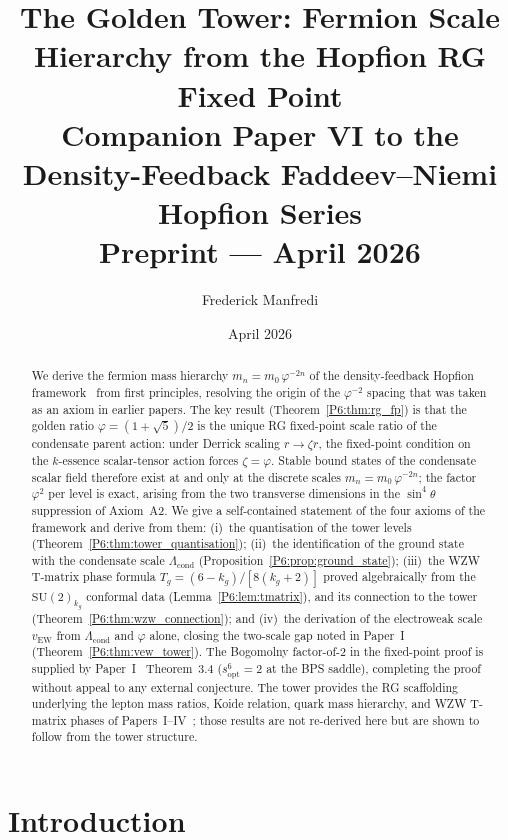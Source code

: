 \documentclass[11pt,a4paper]{article}
\title{\textbf{The Golden Tower: Fermion Scale Hierarchy from the Hopfion RG Fixed Point}
\\[0.6em]
{\large Companion Paper VI to the Density-Feedback
Faddeev--Niemi Hopfion Series}
\\[0.6em]
\large Preprint --- April 2026}
\author{Frederick Manfredi}
\date{April 2026}
\theoremstyle{definition}
\theoremstyle{remark}
\newcommand{\vp}{\varphi}
\newcommand{\sopt}{s_{\mathrm{opt}}}
\newcommand{\vEW}{v_{\mathrm{EW}}}
\newcommand{\Lcond}{\Lambda_{\mathrm{cond}}}
\begin{document}
\maketitle

\begin{abstract}
We derive the fermion mass hierarchy $m_n = m_0\,\vp^{-2n}$ of the
density-feedback Hopfion framework~\cite{Paper1,Paper2,Paper3,Paper4,Paper5}
from first principles, resolving the origin of the $\vp^{-2}$ spacing
that was taken as an axiom in earlier papers.
The key result (Theorem~\ref{P6:thm:rg_fp}) is that the golden ratio
$\vp = (1+\sqrt{5})/2$ is the unique RG fixed-point scale ratio of the
condensate parent action: under Derrick scaling $r\to\zeta r$, the
fixed-point condition on the $k$-essence scalar-tensor action forces
$\zeta = \vp$.
Stable bound states of the condensate scalar field therefore exist at
and only at the discrete scales $m_n = m_0\,\vp^{-2n}$; the factor
$\vp^2$ per level is exact, arising from the two transverse dimensions
in the $\sin^4\!\theta$ suppression of Axiom~A2.
We give a self-contained statement of the four axioms of the framework
and derive from them: (i)~the quantisation of the tower levels
(Theorem~\ref{P6:thm:tower_quantisation}); (ii)~the identification of the
ground state with the condensate scale $\Lcond$
(Proposition~\ref{P6:prop:ground_state}); (iii)~the WZW T-matrix phase
formula $T_g=(6-k_g)/[8(k_g+2)]$ proved algebraically from the
$\mathrm{SU}(2)_{k_g}$ conformal data (Lemma~\ref{P6:lem:tmatrix}), and its
connection to the tower (Theorem~\ref{P6:thm:wzw_connection}); and
(iv)~the derivation of the electroweak scale $\vEW$ from $\Lcond$ and
$\vp$ alone, closing the two-scale gap noted in Paper~I
(Theorem~\ref{P6:thm:vew_tower}).
The Bogomolny factor-of-$2$ in the fixed-point proof is supplied by
Paper~I~\cite{Paper1} Theorem~3.4 ($\sopt^6 = 2$ at the BPS saddle), completing
the proof without appeal to any external conjecture.
The tower provides the RG scaffolding underlying the lepton mass ratios,
Koide relation, quark mass hierarchy, and WZW T-matrix phases of
Papers~I--IV~\cite{Paper1,Paper2,Paper3,Paper4}; those results are not
re-derived here but are shown to follow from the tower structure.
\end{abstract}

\tableofcontents
\bigskip

\section{Introduction}
\label{P6:sec:intro}
\end{document}
